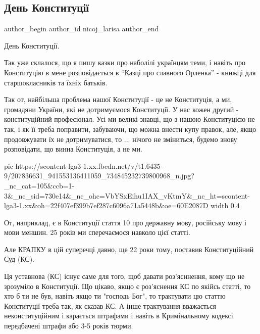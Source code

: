  
 
 
 
 
 
\subsection{День Конституції}
\label{sec:28_06_2021.fb.nicoj_larisa.1.den_konstitucii}
\ifcmt
 author_begin
   author_id nicoj_larisa
 author_end
\fi

День Конституції. 

Так уже склалося, що я пишу казки про наболілі українцям теми, і навіть про
Конституцію в мене розповідається в \enquote{Казці про славного Орленка} - книжці  для
старшокласників та їхніх батьків. 

Так от, найбільша проблема нашої Конституції - це не Конституція, а ми,
громадяни України, які не дотримуємося  Конституції. У нас кожен другий -
конституційний професіонал. Усі ми великі знавці, що з нашою Конституцією не
так, і як її треба поправити, забуваючи, що можна внести купу правок, але, якщо
продовжувати їх не дотримуватися, то ... нічого не зміниться, будемо знову
розповідати, що винна Конституція, а не ми.

\ifcmt
  pic https://scontent-lga3-1.xx.fbcdn.net/v/t1.6435-9/207836631_941553136411059_734845232739800968_n.jpg?_nc_cat=105&ccb=1-3&_nc_sid=730e14&_nc_ohc=VbYSxEihu1IAX_vKtmY&_nc_ht=scontent-lga3-1.xx&oh=22f407ef399b7ef287c6096a71a5448b&oe=60E2087D
  width 0.4
\fi

От, наприклад, є в Конституції стаття 10 про державну мову, російську мову і
мови меншин. 25 років ми сперечаємося навколо цієї статті. 

Але КРАПКУ в цій суперечці давно, ще 22 роки тому, поставив Конституційний Суд
(КС). 

Ця уставнова (КС) існує саме для того, щоб давати роз'ясннення, кому що не
зрозуміло в Конституції. Що цікаво, якщо є  роз'яснення КС по якійсь статті, то
хто б ти не був, навіть якщо ти "господь Бог", то трактувати цю статтю
Конституції треба так, як сказав КС. А інше трактування вважається
неконституційним і карається штрафами і навіть в Кримінальному кодексі
передбачені штрафи або 3-5 років тюрми.   

